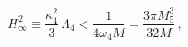 \begin{equation}
H^2_\infty \equiv \frac{\kappa^2_4}{3}\,\Lambda_4 < \frac{1}{4 \omega_4 M}
=\frac{3 \pi M_5^3}{32 M}\,,
\label{con-H}
\end{equation}

